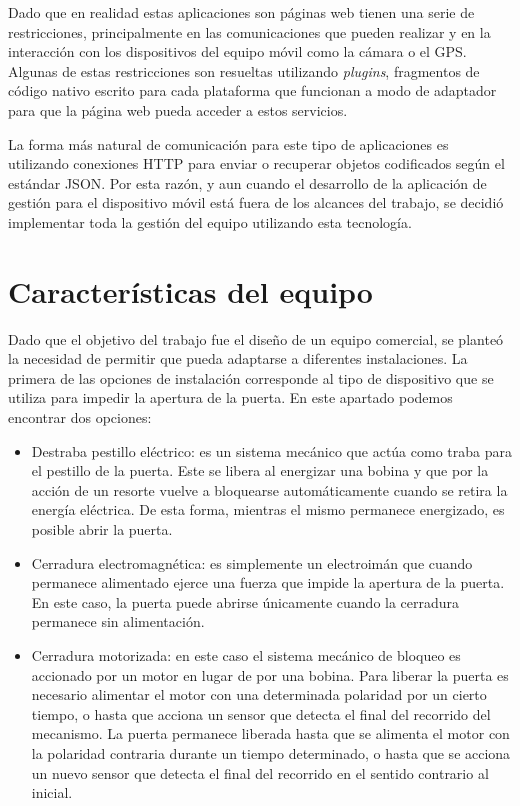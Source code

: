 Dado que en realidad estas aplicaciones son páginas web tienen una serie de restricciones, principalmente en las comunicaciones que pueden realizar y en la interacción con los dispositivos del equipo móvil como la cámara o el GPS. Algunas de estas restricciones son resueltas utilizando \emph{plugins}, fragmentos de código nativo escrito para cada plataforma que funcionan a modo de adaptador para que la página web pueda acceder a estos servicios.

La forma más natural de comunicación para este tipo de aplicaciones es utilizando conexiones HTTP para enviar o recuperar objetos codificados según el estándar JSON. Por esta razón, y aun cuando el desarrollo de la aplicación de gestión para el dispositivo móvil está fuera de los alcances del trabajo, se decidió implementar toda la gestión del equipo utilizando esta tecnología.

\section{Características del equipo}
\label{sec:Caracteristicas}

Dado que el objetivo del trabajo fue el diseño de un equipo comercial, se planteó la necesidad de permitir que pueda adaptarse a diferentes instalaciones. La primera de las opciones de instalación corresponde al tipo de dispositivo que se utiliza para impedir la apertura de la puerta. En este apartado podemos encontrar dos opciones:

\begin{itemize}
	\item Destraba pestillo eléctrico: es un sistema mecánico que actúa como traba para el pestillo de la puerta. Este se libera al energizar una bobina y que por la acción de un resorte vuelve a bloquearse automáticamente cuando se retira la energía eléctrica. De esta forma, mientras el mismo permanece energizado, es posible abrir la puerta.
	
	\item Cerradura electromagnética: es simplemente un electroimán que cuando permanece alimentado ejerce una fuerza que impide la apertura de la puerta. En este caso, la puerta puede abrirse únicamente cuando la cerradura permanece sin alimentación.
	
	\item Cerradura motorizada: en este caso el sistema mecánico de bloqueo es accionado por un motor en lugar de por una bobina. Para liberar la puerta es necesario alimentar el motor con una determinada polaridad por un cierto tiempo, o hasta que acciona un sensor que detecta el final del recorrido del mecanismo. La puerta permanece liberada hasta que se alimenta el motor con la polaridad contraria durante un tiempo determinado, o hasta que se acciona un nuevo sensor que detecta el final del recorrido en el sentido contrario al inicial.
\end{itemize}

